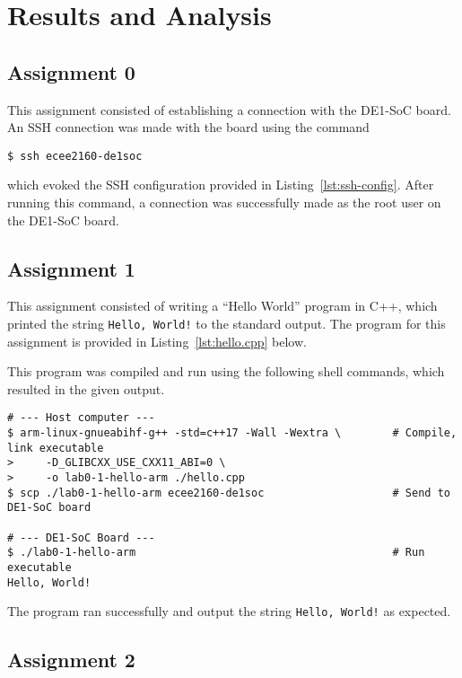 \documentclass[11pt, letterpaper]{article} %
\begin{document}
\section*{Results and Analysis}


\subsection*{Assignment 0}
This assignment consisted of establishing a connection with the DE1-SoC board. An SSH connection was made with the board using the command
\begin{lstlisting}[style=labreportstyle-sh]
$ ssh ecee2160-de1soc
\end{lstlisting}
which evoked the SSH configuration provided in Listing~\ref{lst:ssh-config}. After running this command, a connection was successfully made as the root user on the DE1-SoC board.



\subsection*{Assignment 1}
This assignment consisted of writing a ``Hello World'' program in C++, which printed the string \texttt{Hello, World!} to the standard output. The program for this assignment is provided in Listing~\ref{lst:hello.cpp} below.


This program was compiled and run using the following shell commands, which resulted in the given output.

\begin{lstlisting}[style=labreportstyle-sh]
# --- Host computer ---
$ arm-linux-gnueabihf-g++ -std=c++17 -Wall -Wextra \        # Compile, link executable
>     -D_GLIBCXX_USE_CXX11_ABI=0 \
>     -o lab0-1-hello-arm ./hello.cpp
$ scp ./lab0-1-hello-arm ecee2160-de1soc                    # Send to DE1-SoC board

# --- DE1-SoC Board ---
$ ./lab0-1-hello-arm                                        # Run executable
Hello, World!
\end{lstlisting}

The program ran successfully and output the string \texttt{Hello, World!} as expected.

\subsection*{Assignment 2}
\end{document}
